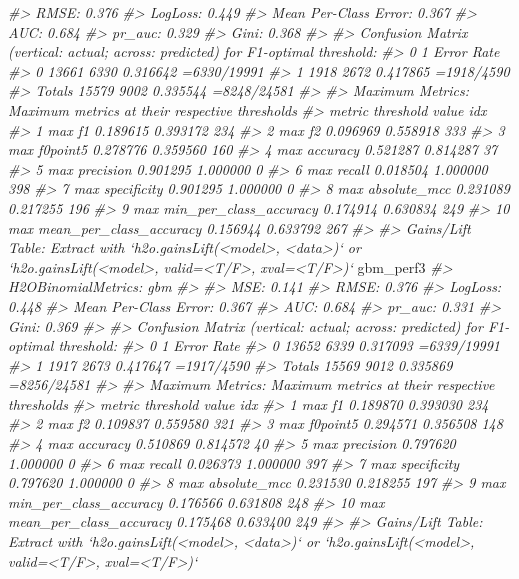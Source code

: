 \documentclass[]{book}
\newenvironment{Shaded}{\begin{snugshade}}{\end{snugshade}}
\newcommand{\CommentTok}[1]{\textcolor[rgb]{0.56,0.35,0.01}{\textit{#1}}}
\newcommand{\NormalTok}[1]{#1}
\begin{document}
\begin{Shaded}
\begin{Highlighting}[]
\CommentTok{#> RMSE:  0.376}
\CommentTok{#> LogLoss:  0.449}
\CommentTok{#> Mean Per-Class Error:  0.367}
\CommentTok{#> AUC:  0.684}
\CommentTok{#> pr_auc:  0.329}
\CommentTok{#> Gini:  0.368}
\CommentTok{#> }
\CommentTok{#> Confusion Matrix (vertical: actual; across: predicted) for F1-optimal threshold:}
\CommentTok{#>            0    1    Error         Rate}
\CommentTok{#> 0      13661 6330 0.316642  =6330/19991}
\CommentTok{#> 1       1918 2672 0.417865   =1918/4590}
\CommentTok{#> Totals 15579 9002 0.335544  =8248/24581}
\CommentTok{#> }
\CommentTok{#> Maximum Metrics: Maximum metrics at their respective thresholds}
\CommentTok{#>                         metric threshold    value idx}
\CommentTok{#> 1                       max f1  0.189615 0.393172 234}
\CommentTok{#> 2                       max f2  0.096969 0.558918 333}
\CommentTok{#> 3                 max f0point5  0.278776 0.359560 160}
\CommentTok{#> 4                 max accuracy  0.521287 0.814287  37}
\CommentTok{#> 5                max precision  0.901295 1.000000   0}
\CommentTok{#> 6                   max recall  0.018504 1.000000 398}
\CommentTok{#> 7              max specificity  0.901295 1.000000   0}
\CommentTok{#> 8             max absolute_mcc  0.231089 0.217255 196}
\CommentTok{#> 9   max min_per_class_accuracy  0.174914 0.630834 249}
\CommentTok{#> 10 max mean_per_class_accuracy  0.156944 0.633792 267}
\CommentTok{#> }
\CommentTok{#> Gains/Lift Table: Extract with `h2o.gainsLift(<model>, <data>)` or `h2o.gainsLift(<model>, valid=<T/F>, xval=<T/F>)`}
\NormalTok{gbm_perf3}
\CommentTok{#> H2OBinomialMetrics: gbm}
\CommentTok{#> }
\CommentTok{#> MSE:  0.141}
\CommentTok{#> RMSE:  0.376}
\CommentTok{#> LogLoss:  0.448}
\CommentTok{#> Mean Per-Class Error:  0.367}
\CommentTok{#> AUC:  0.684}
\CommentTok{#> pr_auc:  0.331}
\CommentTok{#> Gini:  0.369}
\CommentTok{#> }
\CommentTok{#> Confusion Matrix (vertical: actual; across: predicted) for F1-optimal threshold:}
\CommentTok{#>            0    1    Error         Rate}
\CommentTok{#> 0      13652 6339 0.317093  =6339/19991}
\CommentTok{#> 1       1917 2673 0.417647   =1917/4590}
\CommentTok{#> Totals 15569 9012 0.335869  =8256/24581}
\CommentTok{#> }
\CommentTok{#> Maximum Metrics: Maximum metrics at their respective thresholds}
\CommentTok{#>                         metric threshold    value idx}
\CommentTok{#> 1                       max f1  0.189870 0.393030 234}
\CommentTok{#> 2                       max f2  0.109837 0.559580 321}
\CommentTok{#> 3                 max f0point5  0.294571 0.356508 148}
\CommentTok{#> 4                 max accuracy  0.510869 0.814572  40}
\CommentTok{#> 5                max precision  0.797620 1.000000   0}
\CommentTok{#> 6                   max recall  0.026373 1.000000 397}
\CommentTok{#> 7              max specificity  0.797620 1.000000   0}
\CommentTok{#> 8             max absolute_mcc  0.231530 0.218255 197}
\CommentTok{#> 9   max min_per_class_accuracy  0.176566 0.631808 248}
\CommentTok{#> 10 max mean_per_class_accuracy  0.175468 0.633400 249}
\CommentTok{#> }
\CommentTok{#> Gains/Lift Table: Extract with `h2o.gainsLift(<model>, <data>)` or `h2o.gainsLift(<model>, valid=<T/F>, xval=<T/F>)`}


\end{Highlighting}
\end{Shaded}
\end{document}
